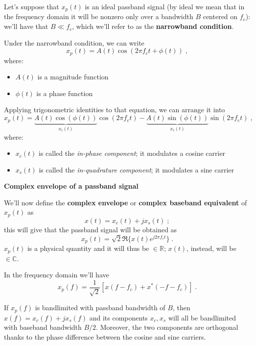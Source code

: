 \documentclass[a4paper, 12pt]{book}
\begin{document}
Let's suppose that $x_p(t)$ is an ideal passband signal (by ideal we mean that in the frequency domain it will be nonzero only over a bandwidth $B$ centered on $f_c$): we'll have that $B \ll f_c$, which we'll refer to as the \textbf{narrowband condition}.

Under the narrowband condition, we can write
$$
x_p(t) = A(t) \cos(2\pi f_c t + \phi(t)) \;,
$$
where:
\begin{itemize}
    \item $A(t)$ is a magnitude function
    \item $\phi(t)$ is a phase function
\end{itemize}
Applying trigonometric identities to that equation, we can arrange it into
$$
x_p(t) = \underbrace{A(t)\cos(\phi(t))}_{x_c(t)} \cos(2\pi f_c t) - \underbrace{A(t)\sin(\phi(t))}_{x_s(t)} \sin(2\pi f_c t) \;,
$$
where:
\begin{itemize}
    \item $x_c(t)$ is called the \textit{in-phase component}; it modulates a cosine carrier
    \item $x_s(t)$ is called the \textit{in-quadrature component}; it modulates a sine carrier
\end{itemize}

\begin{tcolorbox}[colframe=cyan!80!blue, colback=white, boxrule=1pt, arc=2pt]
    \textcolor{cyan!80!blue}{\textbf{Complex envelope of a passband signal}}

    We'll now define the \textbf{complex envelope} or \textbf{complex baseband equivalent} of $x_p(t)$ as
    $$
    x(t) = x_c(t) + j x_s(t) \;;
    $$
    this will give that the passband signal will be obtained as
    $$
    x_p(t) = \sqrt{2} \Re \{ x(t) e^{j 2\pi f_c t} \} \;.
    $$
    $x_p(t)$ is a physical quantity and it will thus be $\in \mathbb{R}$; $x(t)$, instead, will be $\in \mathbb{C}$.
\end{tcolorbox}

In the frequency domain we'll have
\begin{equation}
x_p(f) = \frac{1}{\sqrt{2}} [ x(f-f_c) + x^*(-f-f_c) ] \;. \tag{2.5}
\end{equation}

If $x_p(f)$ is bandlimited with passband bandwidth of $B$, then $x(f) = x_c(f) + j x_s(f)$ and its components $x_c, x_s$ will all be bandlimited with baseband bandwidth $B/2$.
Moreover, the two components are orthogonal thanks to the phase difference between the cosine and sine carriers.
\end{document}
